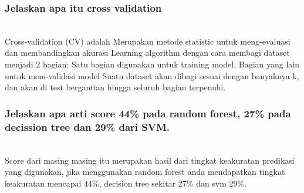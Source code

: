\subsubsection{ Jelaskan apa itu cross validation}
\hfill\\
Cross-validation (CV) adalah Merupakan metode statistic untuk meng-evaluasi dan membandingkan akurasi Learning algorithm dengan cara membagi dataset menjadi 2 bagian: Satu bagian digunakan untuk training model, Bagian yang lain untuk mem-validasi model Suatu dataset akan dibagi sesuai dengan banyaknya k, dan akan di test bergantian hingga seluruh bagian terpenuhi.

\subsubsection{Jelaskan apa arti score 44\% pada random forest, 27\% pada decission tree dan 29\% dari SVM.}
\hfill\\
Score dari masing masing itu merupakan hasil dari tingkat keakuratan predikasi yang digunakan, jika menggunakan random forest anda mendapatkan tingkat keakuratan mencapai 44\%, decision tree sekitar 27\% dan svm 29\%.

